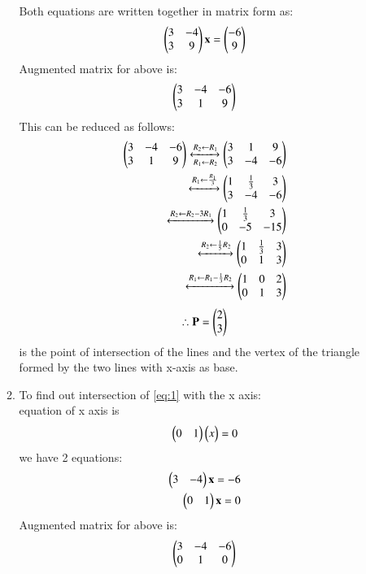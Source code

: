 \documentclass[journal,12pt,twocolumn]{IEEEtran}
\renewcommand\thesection{\arabic{section}}
\begin{document}
\begin{enumerate}[label=\thesection.\arabic*.,ref=\thesection.\theenumi]
\begin{enumerate}
Both equations are written together in matrix form as:
\begin{align}
    \begin{pmatrix}3 & -4 \\ 3 & 9\end{pmatrix}\mathbf{x}=
\begin{pmatrix}-6 \\ 9\end{pmatrix}
\end{align}
Augmented matrix for above is:
\begin{align}
    \begin{pmatrix}3 & -4 & -6\\
           3 & 1 & 9\end{pmatrix}
\end{align}
This can be reduced as follows:
 \begin{align}
     \begin{pmatrix}3 & -4 & -6\\
           3 & 1 & 9\end{pmatrix}
    \xleftrightarrow[R_1 \leftarrow R_2]
    {R_2 \leftarrow R_1}
    \begin{pmatrix}3 & 1 & 9\\
          3 & -4 & -6\end{pmatrix}\\
          \xleftrightarrow{R_1 \leftarrow \frac{R_1}{3}}
    \begin{pmatrix}1 &\frac{1}{3}&3\\
        3&-4&-6\end{pmatrix}\\
        \xleftrightarrow{R_2\leftarrow R_2-3R_1}
    \begin{pmatrix}1&\frac{1}{3}&3\\0&-5&-15\end{pmatrix}\\
    \xleftrightarrow{R_2\leftarrow \frac{1}{5}R_2}
    \begin{pmatrix}1&\frac{1}{3}&3\\0&1&3\end{pmatrix}\\
    \xleftrightarrow{R_1\leftarrow R_1-\frac{1}{3}R_2}
    \begin{pmatrix}1&0&2\\0&1&3\end{pmatrix}
 \end{align}
\begin{align}
\therefore \mathbf{P}=\begin{pmatrix}2\\3\end{pmatrix}
\end{align}
is the point of intersection of the lines and the vertex of the triangle formed by the two lines with x-axis as base.
\item To find out intersection of \eqref{eq:1} with the x axis:\\
    equation of x axis is 
    \begin{align}
        \begin{pmatrix}0&1\end{pmatrix}\begin{pmatrix}x\end{pmatrix}=0
    \end{align}
    we have 2 equations: \begin{align}
        \begin{pmatrix}3&-4\end{pmatrix}\mathbf{x}=-6\\
        \begin{pmatrix}0&1\end{pmatrix}\mathbf{x}=0
    \end{align}
    Augmented matrix for above is:
\begin{align}
    \myvec{3 & -4 & -6\\
           0 & 1 & 0}

\end{align}
\end{enumerate}
\end{enumerate}
\end{document}
